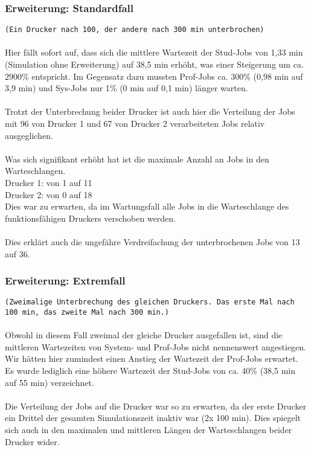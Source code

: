 \documentclass[12pt,a4paper]{article}
\begin{document}
	
	\subsubsection{Erweiterung: Standardfall}
	\texttt{(Ein Drucker nach 100, der andere nach 300 min unterbrochen)}
	\\ 
	\\
	Hier fällt sofort auf, dass sich die mittlere Wartezeit der Stud-Jobs von 1,33 min (Simulation ohne Erweiterung)  auf 38,5 min erhöht, was einer Steigerung um ca. 2900\% entspricht. Im Gegensatz dazu
	mussten Prof-Jobs ca. 300\% (0,98 min auf 3,9 min) und Sys-Jobs nur 1\% (0 min auf 0,1 min) länger warten.\\
	\\
	Trotzt der Unterbrechung beider Drucker ist auch hier die Verteilung der Jobs mit 96 von Drucker 1  und 67 von Drucker 2 verarbeiteten Jobs relativ ausgeglichen.\\
	\\
	Was sich signifikant erhöht hat ist die maximale Anzahl an Jobs in den Warteschlangen. \\
	Drucker 1: von 1 auf 11\\
	Drucker 2: von 0 auf 18\\
	Dies war zu erwarten, da im Wartungsfall alle Jobs in die Warteschlange des funktionsfähigen Druckers verschoben werden.\\
	\\
	Dies erklärt auch die ungefähre Verdreifachung der unterbrochenen Jobs von 13 auf 36.
	
	\subsubsection{Erweiterung: Extremfall}
	\texttt{(Zweimalige Unterbrechung des gleichen Druckers. Das erste Mal 
	nach 100 min, das zweite Mal nach 300 min.)}
	\\ 
	\\
	Obwohl in diesem Fall zweimal der gleiche Drucker ausgefallen ist, sind die mittleren Wartezeiten von System- und Prof-Jobs nicht nennenswert angestiegen. Wir hätten hier zumindest
	einen Anstieg der Wartezeit der Prof-Jobs erwartet. Es wurde lediglich eine höhere Wartezeit der Stud-Jobs von ca. 40\% (38,5 min auf 55 min) verzeichnet.
	\\
	\\
	Die Verteilung der Jobs auf die Drucker war so zu erwarten, da der erste Drucker ein Drittel der gesamten Simulationszeit inaktiv war (2x 100 min). Dies spiegelt sich auch in den maximalen und
	mittleren Längen der Warteschlangen beider Drucker wider.
	 
\end{document}
